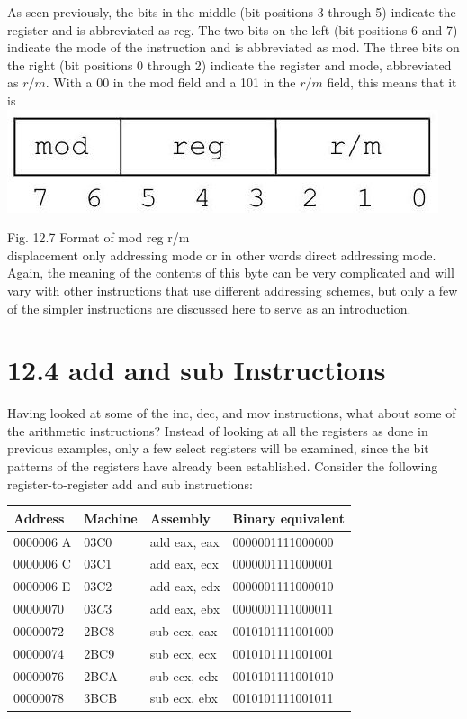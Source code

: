 \documentclass[10pt]{article}
\begin{document}
As seen previously, the bits in the middle (bit positions 3 through 5) indicate the register and is abbreviated as reg. The two bits on the left (bit positions 6 and 7) indicate the mode of the instruction and is abbreviated as mod. The three bits on the right (bit positions 0 through 2) indicate the register and mode, abbreviated as $r / m$. With a 00 in the mod field and a 101 in the $r / m$ field, this means that it is\\
\includegraphics[max width=\textwidth, center]{2025_03_24_ebe50cc223a6fbc49eecg-282}

Fig. 12.7 Format of mod reg r/m\\
displacement only addressing mode or in other words direct addressing mode. Again, the meaning of the contents of this byte can be very complicated and will vary with other instructions that use different addressing schemes, but only a few of the simpler instructions are discussed here to serve as an introduction.

\section*{12.4 add and sub Instructions}
Having looked at some of the inc, dec, and mov instructions, what about some of the arithmetic instructions? Instead of looking at all the registers as done in previous examples, only a few select registers will be examined, since the bit patterns of the registers have already been established. Consider the following register-to-register add and sub instructions:

\begin{center}
\begin{tabular}{|l|l|l|l|}
\hline
Address & Machine & Assembly & Binary equivalent \\
\hline
0000006 A & 03C0 & add eax, eax & 0000001111000000 \\
\hline
0000006 C & 03C1 & add eax, ecx & 0000001111000001 \\
\hline
0000006 E & 03C2 & add eax, edx & 0000001111000010 \\
\hline
00000070 & $03 C 3$ & add eax, ebx & 0000001111000011 \\
\hline
00000072 & 2BC8 & sub ecx, eax & 0010101111001000 \\
\hline
00000074 & 2BC9 & sub ecx, ecx & 0010101111001001 \\
\hline
00000076 & 2BCA & sub ecx, edx & 0010101111001010 \\
\hline
00000078 & 3BCB & sub ecx, ebx & 0010101111001011 \\
\hline
\end{tabular}
\end{center}
\end{document}
